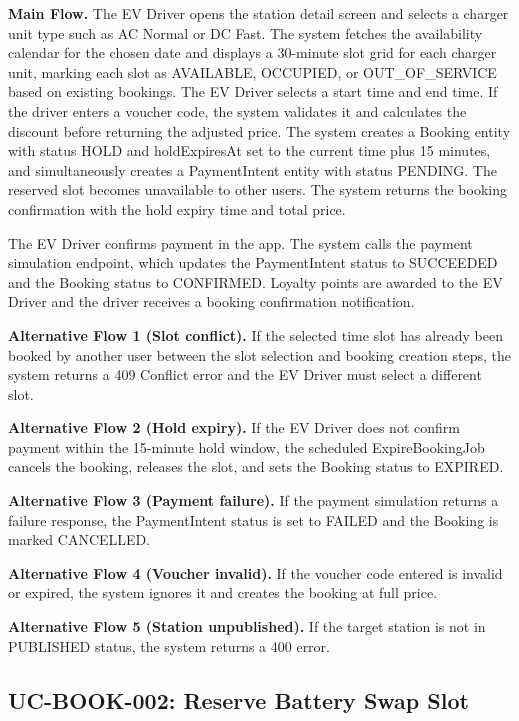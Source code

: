 \documentclass[../Main.tex]{subfiles}
\begin{document}
\textbf{Main Flow.} The EV Driver opens the station detail screen and selects a charger unit type such as AC Normal or DC Fast. The system fetches the availability calendar for the chosen date and displays a 30-minute slot grid for each charger unit, marking each slot as AVAILABLE, OCCUPIED, or OUT\_OF\_SERVICE based on existing bookings. The EV Driver selects a start time and end time. If the driver enters a voucher code, the system validates it and calculates the discount before returning the adjusted price. The system creates a Booking entity with status HOLD and holdExpiresAt set to the current time plus 15 minutes, and simultaneously creates a PaymentIntent entity with status PENDING. The reserved slot becomes unavailable to other users. The system returns the booking confirmation with the hold expiry time and total price.

The EV Driver confirms payment in the app. The system calls the payment simulation endpoint, which updates the PaymentIntent status to SUCCEEDED and the Booking status to CONFIRMED. Loyalty points are awarded to the EV Driver and the driver receives a booking confirmation notification.

\textbf{Alternative Flow 1 (Slot conflict).} If the selected time slot has already been booked by another user between the slot selection and booking creation steps, the system returns a 409 Conflict error and the EV Driver must select a different slot.

\textbf{Alternative Flow 2 (Hold expiry).} If the EV Driver does not confirm payment within the 15-minute hold window, the scheduled ExpireBookingJob cancels the booking, releases the slot, and sets the Booking status to EXPIRED.

\textbf{Alternative Flow 3 (Payment failure).} If the payment simulation returns a failure response, the PaymentIntent status is set to FAILED and the Booking is marked CANCELLED.

\textbf{Alternative Flow 4 (Voucher invalid).} If the voucher code entered is invalid or expired, the system ignores it and creates the booking at full price.

\textbf{Alternative Flow 5 (Station unpublished).} If the target station is not in PUBLISHED status, the system returns a 400 error.

\subsection{UC-BOOK-002: Reserve Battery Swap Slot}
\label{subsection:2.3.2}
\end{document}
